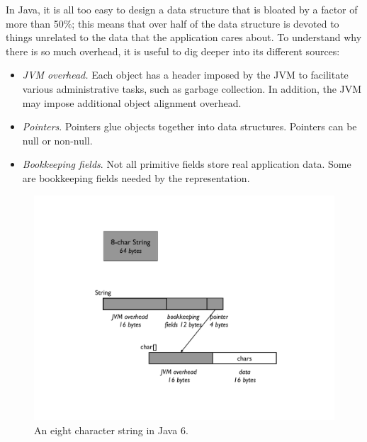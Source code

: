 In Java, it is all too easy to design a data structure that is bloated by a factor of more than 50\%; this means that over half of the data structure is devoted to things unrelated to the data that the application cares about. To understand why there is so much overhead, it is useful to dig deeper into its different sources:  
\begin{itemize}
\item \emph{JVM overhead.}   Each
object has a header imposed by the JVM to facilitate various administrative tasks, such as garbage collection. In addition, the JVM may impose additional object alignment overhead.
\item \emph{Pointers}. Pointers glue objects together into data structures. Pointers can be null or non-null.   
\item \emph{Bookkeeping fields}.  Not all primitive
fields store real application data. Some are bookkeeping fields needed by the representation.
\end{itemize}


\begin{figure}
  \centering
  \includegraphics[width=.70\textwidth]{part1/Figures/memoryhealth/eight-char-string.pdf}
  \caption{An eight character string in Java 6.}
  \label{fig:eight-char-string}
\end{figure}

